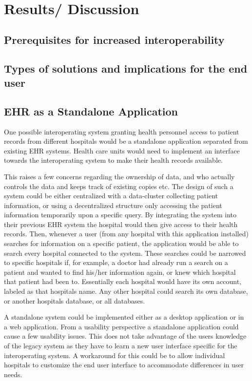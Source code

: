 \documentclass[14pt]{article}
\begin{document}
\newpage

\section{Results/ Discussion}
\label{sec:Results}

\subsection{Prerequisites for increased interoperability}

\subsection{Types of solutions and implications for the end user}

\subsection{EHR as a Standalone Application}
One possible interoperating system granting health personnel access to patient records from different hospitals would be a standalone application separated from existing \gls{EHR} systems. Health care units would need to implement an interface towards the interoperating system to make their health records available. 

This raises a few concerns regarding the ownership of data, and who actually controls the data and keeps track of existing copies etc. The design of such a system could be either centralized with a data-cluster collecting patient information, or using a decentralized structure only accessing the patient information temporarily upon a specific query. By integrating the system into their previous \gls{EHR} system the hospital would then give access to their health records. Then, whenever a user (from any hospital with this application installed) searches for information on a specific patient, the application would be able to search every hospital connected to the system. These searches could be narrowed to specific hospitals if, for example, a doctor had already run a search on a patient and wanted to find his/her information again, or knew which hospital that patient had been to. Essentially each hospital would have its own account, labeled as that hospitals name. Any other hospital could search its own database, or another hospitals database, or all databases.

A standalone system could be implemented either as a desktop application or in a web application. From a usability perspective a standalone application could cause a few usability issues. This does not take advantage of the users knowledge of the legacy system as they have to learn a new user interface specific for the interoperating system. A workaround for this could be to allow individual hospitals to customize the end user interface to accommodate differences in user needs.
\end{document}
